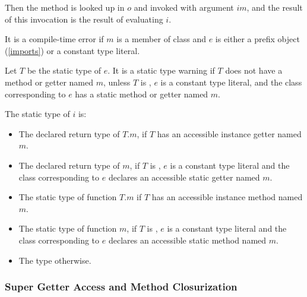 \documentclass{article}
\begin{document}
\LMHash{}
Then the method  is looked up in $o$ and invoked with argument $im$,
and the result of this invocation is the result of evaluating $i$.

%

\LMHash{}
It is a compile-time error if $m$ is a member of class  and $e$ is either a prefix object (\ref{imports}) or a constant type literal.


\LMHash{}
Let $T$ be the static type of $e$.
It is a static type warning if $T$ does not have a method or getter named $m$,
unless $T$ is ,
$e$ is a constant type literal,
and the class corresponding to $e$ has a static method or getter named $m$.

\LMHash{}
The static type of $i$ is:
\begin{itemize}
\item The declared return type of $T.m$, if $T$ has an accessible instance getter named $m$.
\item The declared return type of $m$, if $T$ is , $e$ is a constant type literal and the class corresponding to $e$ declares an accessible static getter named $m$.
\item The static type of function $T.m$ if $T$ has an accessible instance method named $m$.
\item The static type of function $m$, if $T$ is , $e$ is a constant type literal and the class corresponding to $e$ declares an accessible static method named $m$.
\item The type \DYNAMIC{} otherwise.
\end{itemize}


\subsubsection{Super Getter Access and Method Closurization}
\end{document}
